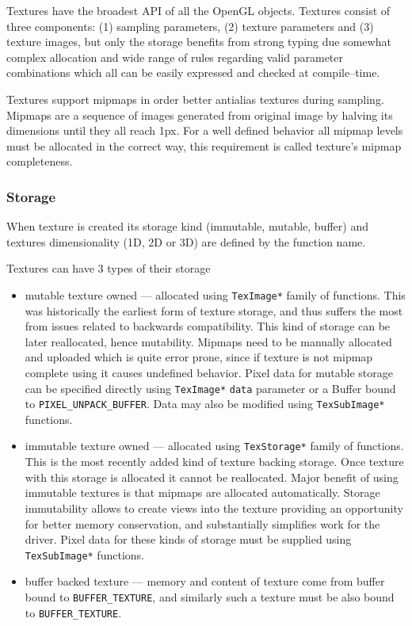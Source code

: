 Textures have the broadest API of all the OpenGL objects.
Textures consist of three components: (1) sampling parameters, (2) texture parameters and (3) texture images, but only the storage benefits 
from strong typing due somewhat complex allocation and wide range of rules regarding valid parameter combinations which all can be easily expressed and checked at compile--time.

Textures support mipmaps in order better antialias textures during sampling. 
Mipmaps are a sequence of images generated from original image by halving its dimensions until they all reach 1px.
For a well defined behavior all mipmap levels must be allocated in the correct way, this requirement is called texture's mipmap completeness.

\subsubsection{Storage}

When texture is created its storage kind (immutable, mutable, buffer) and textures dimensionality (1D, 2D or 3D) are defined by the function name.

Textures can have 3 types of their storage
\begin{itemize}
    \item mutable texture owned --- allocated using \texttt{TexImage*} family of functions. 
        This was historically the earliest form of texture storage, and thus suffers the most from issues related to backwards compatibility. 
        This kind of storage can be later reallocated, hence mutability. 
        Mipmaps need to be manually allocated and uploaded which is quite error prone, 
        since if texture is not mipmap complete using it causes undefined behavior.
        Pixel data for mutable storage can be specified directly using
        \texttt{TexImage*} \texttt{data} parameter or a Buffer bound to \texttt{PIXEL\_UNPACK\_BUFFER}.
        Data may also be modified using \texttt{TexSubImage*} functions.
    \item immutable texture owned --- allocated using \texttt{TexStorage*} family of functions. 
        This is the most recently added kind of texture backing storage. 
        Once texture with this storage is allocated it cannot be reallocated. 
        Major benefit of using immutable textures is that mipmaps are allocated automatically. 
        Storage immutability allows to create views into the texture providing 
        an opportunity for better memory conservation, and substantially simplifies work for the driver.
        Pixel data for these kinds of storage must be supplied using \texttt{TexSubImage*} functions.
    \item buffer backed texture --- memory and content of texture come from buffer bound to \texttt{BUFFER\_TEXTURE},
        and similarly such a texture must be also bound to \texttt{BUFFER\_TEXTURE}.
\end{itemize}

